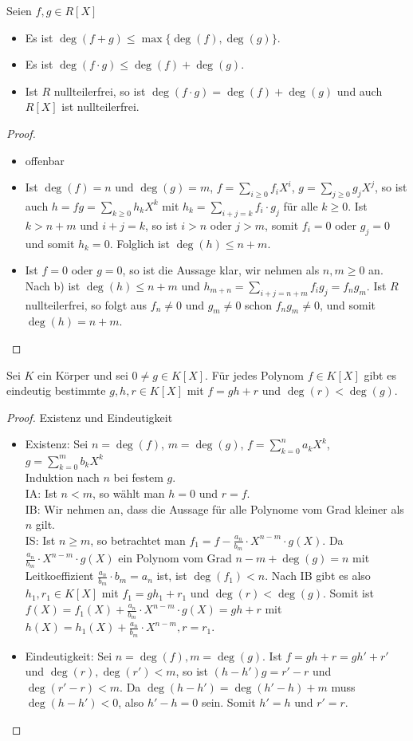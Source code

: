 \begin{proposition}
	Seien $f,g \in R[X]$
	\begin{itemize}
		\item Es ist $\deg(f+g)\le \max\{\deg(f), \deg(g)\}$.
		\item Es ist $\deg(f\cdot g) \le \deg(f)+\deg(g)$.
		\item Ist $R$ nullteilerfrei, so ist $\deg(f\cdot g) = \deg(f)+\deg(g)$ und auch $R[X]$ ist nullteilerfrei.
	\end{itemize}
\end{proposition}
\begin{proof}
	\begin{itemize}
		\item offenbar
		\item Ist $\deg(f)=n$ und $\deg(g)=m$, $f=\sum_{i \ge 0} f_iX^i$, $g=\sum_{j\ge 0} g_jX^j$, 
		so ist auch $h=fg=\sum_{k \ge 0} h_kX^k$ mit $h_k=\sum_{i+j=k} f_i\cdot g_j$ für alle $k \ge 0$.
		Ist  $k>n+m$ und $i+j=k$, so ist $i>n$ oder $j>m$, somit $f_i=0$ oder $g_j=0$ und somit $h_k=0$. 
		Folglich ist $\deg(h) \le n+m$.
		\item Ist $f=0$ oder $g=0$, so ist die Aussage klar, wir nehmen als $n,m \ge 0$ an. Nach b) ist $\deg(h) \le 
		n+m$ und $h_{m+n}=\sum_{i+j=n+m} f_ig_j=f_ng_m$. Ist $R$ nullteilerfrei, so folgt aus $f_n \neq 0$
		und $g_m\neq 0$ schon $f_ng_m\neq 0$, und somit $\deg(h)=n+m$.
	\end{itemize}
\end{proof}
\begin{theorem}[Polynomdivision]
	Sei $K$ ein Körper und sei $0 \neq g \in K[X]$. Für jedes Polynom
	$f \in K[X]$ gibt es eindeutig bestimmte $g,h,r \in K[X]$ mit $f=gh+r$ und $\deg(r)<\deg(g)$. 
\end{theorem}
\begin{proof}
	Existenz und Eindeutigkeit
	\begin{itemize}
		\item Existenz: Sei $n=\deg(f)$, $m=\deg(g)$, $f=\sum _{k=0}^{n} a_kX^k$, $g=\sum _{k=0}^{m} b_kX^k$ \\
		Induktion nach $n$ bei festem $g$. \\
		IA: Ist $n<m$, so wählt man $h=0$ und $r=f$.\\
		IB: Wir nehmen an, dass die Aussage für alle Polynome vom Grad kleiner als $n$ gilt.\\
		IS: Ist $n \ge m$, so betrachtet man $f_1=f-\frac{a_n}{b_m}\cdot X^{n-m}\cdot g(X)$. Da $\frac{a_n}{b_m}\cdot 
		X^{n-m}\cdot g(X)$ ein Polynom vom Grad $n-m+\deg(g)=n$ mit Leitkoeffizient $\frac{a_n}{b_m}\cdot b_m=a_n$ ist, ist
		$\deg(f_1)<n$. Nach IB gibt es also $h_1, r_1 \in K[X]$ mit $f_1=gh_1+r_1$ und $\deg(r)<\deg(g)$. Somit ist 
		$f(X)=f_1(X)+\frac{a_n}{b_m}\cdot X^{n-m}\cdot g(X)=gh+r$ mit $h(X)=h_1(X)+\frac{a_n}{b_m}\cdot X^{n-m}, r=r_1$.
		\item Eindeutigkeit: Sei $n=\deg(f), m=\deg(g)$. Ist $f=gh+r=gh'+r'$ und $\deg(r),\deg(r')<m$, so ist $(h-h')g=r'-r$ und
		$\deg(r'-r)<m$. Da $\deg(h-h')=\deg(h'-h)+m$ muss $\deg(h-h')<0$, also $h'-h=0$ sein. Somit $h'=h$ und $r'=r$.
	\end{itemize}
\end{proof}
